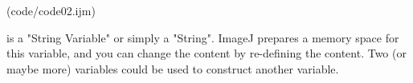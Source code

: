 (code/code02.ijm)

 is a "String Variable" or simply a "String". 
ImageJ prepares a memory space for this variable, and you can change the content by re-defining the content. Two (or maybe more) variables could be used to construct another variable.